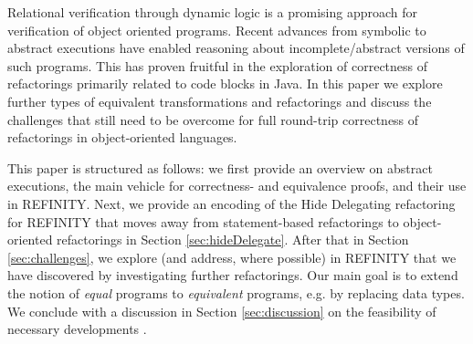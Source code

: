 
Relational verification through dynamic logic is a promising approach for verification of object oriented programs.
Recent advances from symbolic to abstract executions have enabled reasoning about incomplete/abstract versions of such programs.
This has proven fruitful in the exploration of correctness of refactorings primarily related to code blocks in Java.
In this paper we explore further types of equivalent transformations and refactorings and discuss the challenges that still need to be overcome for full round-trip correctness of refactorings in object-oriented languages.


This paper is structured as follows: we first provide an overview on abstract executions, the main vehicle for correctness- and equivalence proofs, and their use in REFINITY.
Next, we provide an encoding of the Hide Delegating refactoring for REFINITY that moves away from statement-based refactorings to object-oriented refactorings in Section \ref{sec:hideDelegate}.
After that in Section \ref{sec:challenges}, we explore (and address, where possible)  in REFINITY that we have discovered by investigating further refactorings.
Our main goal is to extend the notion of \textit{equal} programs to \textit{equivalent} programs, e.g. by replacing data types.
We conclude with a discussion in Section \ref{sec:discussion} on the feasibility of necessary developments .

